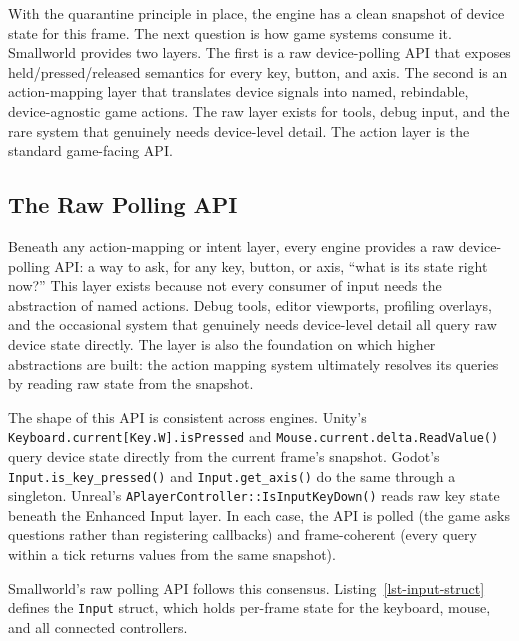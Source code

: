 \documentclass[
  11pt,
  letterpaper,
  DIV=11,
  numbers=noendperiod,
  twoside,
  open=right]{scrreprt}
\begin{document}
With the quarantine principle in place, the engine has a clean snapshot
of device state for this frame. The next question is how game systems
consume it. Smallworld provides two layers. The first is a raw
device-polling API that exposes held/pressed/released semantics for
every key, button, and axis. The second is an action-mapping layer that
translates device signals into named, rebindable, device-agnostic game
actions. The raw layer exists for tools, debug input, and the rare
system that genuinely needs device-level detail. The action layer is the
standard game-facing API.

\subsection{The Raw Polling API}\label{the-raw-polling-api}

Beneath any action-mapping or intent layer, every engine provides a raw
device-polling API: a way to ask, for any key, button, or axis, ``what
is its state right now?'' This layer exists because not every consumer
of input needs the abstraction of named actions. Debug tools, editor
viewports, profiling overlays, and the occasional system that genuinely
needs device-level detail all query raw device state directly. The layer
is also the foundation on which higher abstractions are built: the
action mapping system ultimately resolves its queries by reading raw
state from the snapshot.

The shape of this API is consistent across engines. Unity's
\texttt{Keyboard.current{[}Key.W{]}.isPressed} and
\texttt{Mouse.current.delta.ReadValue()} query device state directly
from the current frame's snapshot. Godot's
\texttt{Input.is\_key\_pressed()} and \texttt{Input.get\_axis()} do the
same through a singleton. Unreal's
\texttt{APlayerController::IsInputKeyDown()} reads raw key state beneath
the Enhanced Input layer. In each case, the API is polled (the game asks
questions rather than registering callbacks) and frame-coherent (every
query within a tick returns values from the same snapshot).

Smallworld's raw polling API follows this consensus.
Listing~\ref{lst-input-struct} defines the \texttt{Input} struct, which
holds per-frame state for the keyboard, mouse, and all connected
controllers.
\end{document}
